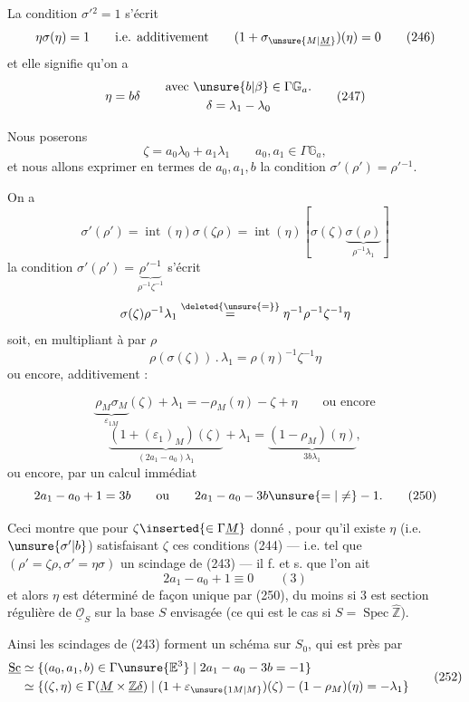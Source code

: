 La condition $\sigma'{}^2=1$ s'écrit
\[
\eta\sigma(\eta)=1
\qquad\text{i.e. additivement}\qquad
(1+\sigma_{\unsure{M|\underline M}})(\eta)=0
\tag{246}
\]
et elle signifie qu'on a
\[
\eta=b\delta\qquad
\begin{gathered}
\text{avec }\unsure{b|\beta}\in\Gamma\mathbb G_a.\\
\delta=\lambda_1-\lambda_0
\end{gathered}
\tag{247}
\]

Nous poserons
\[
\zeta=a_0\lambda_0+a_1\lambda_1
\qquad a_0,a_1\in\Gamma\mathbb G_a,
\tag{248}
\]
et nous allons exprimer en termes de $a_0,a_1,b$ la condition
$\sigma'(\rho')=\rho'{}^{-1}$.

On a
\[
\sigma'(\rho')=\operatorname{int}(\eta)\sigma(\zeta\rho)
=\operatorname{int}(\eta)
\left[\sigma(\zeta)\underbrace{\sigma(\rho)}_{\rho^{-1}\lambda_1}\right]
\]
la condition
$\sigma'(\rho')=\underbrace{\rho'{}^{-1}}_{\rho^{-1}\zeta^{-1}}$
s'écrit
\[
\sigma(\zeta)\rho^{-1}\lambda_1
\overset{\deleted{\unsure{=}}}{=}
\eta^{-1}\rho^{-1}\zeta^{-1}\eta
\]
soit, en multipliant à  par $\rho$
\[
\rho(\sigma(\zeta))\mathbin{.}\lambda_1
=\rho(\eta)^{-1}\zeta^{-1}\eta
\]
ou encore, additivement :



\[
\underbrace{\rho_M\sigma_M}_{\varepsilon_{1M}}(\zeta)+\lambda_1
=-\rho_M(\eta)-\zeta+\eta
\qquad\text{ou encore}
\]
\[
\underbrace{(1+(\varepsilon_1)_M)(\zeta)}_{(2a_1-a_0)\lambda_1}
+\lambda_1
=\underbrace{(1-\rho_M)(\eta)}_{3b\lambda_1},
\tag{249}
\]
ou encore, par un calcul immédiat
\[
2a_1-a_0+1=3b
\qquad\text{ou}\qquad
2a_1-a_0-3b\unsure{=|\ne}-1.
\tag{250}
\]

Ceci montre que pour $\zeta\inserted{\in\Gamma\underline M}$ donné
, pour qu'il existe $\eta$
(i.e. $\unsure{\sigma'|b}$) satisfaisant  $\zeta$ ces
conditions (244) --- i.e.  tel que
$(\rho'=\zeta\rho,\sigma'=\eta\sigma)$  un scindage de
(243) --- il f. et s. que l'on ait
\[
2a_1-a_0+1\equiv0\qquad(3)
\tag{251}
\]
et alors $\eta$ est déterminé de façon unique par (250), du moins si $3$ est
section régulière de $\underline{\mathcal O}_S$ sur la base $S$
envisagée (ce qui est le cas si $S=\operatorname{Spec}\widehat{\mathbb Z}$).

Ainsi les scindages de (243) forment un schéma
 sur $S_0$, qui est
  près par
\[
\begin{aligned}
\underline{\mathrm{Sc}}
&\simeq
\{(a_0,a_1,b)\in\Gamma\unsure{\mathbb E^3}
  \mid 2a_1-a_0-3b=-1\}\\
&\simeq
\{(\zeta,\eta)\in\Gamma(\underline M\times\underline{\mathbb Z\delta})
  \mid(1+\varepsilon_{\unsure{1M|M}})(\zeta)
       -(1-\rho_M)(\eta)=-\lambda_1\}
\end{aligned}
\tag{252}
\]

